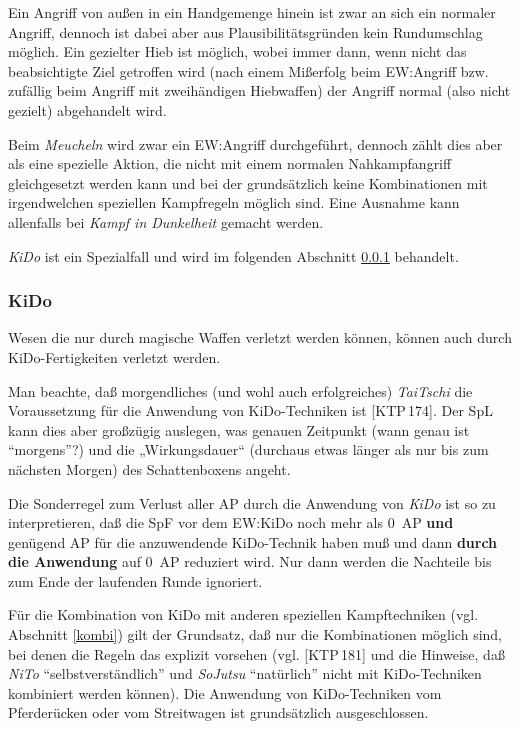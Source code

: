 \documentclass[10pt,a4paper,germanpar]{article}
\begin{document}
Ein Angriff von außen in ein Handgemenge hinein ist zwar an sich ein
normaler Angriff, dennoch ist dabei aber aus Plausibilitätsgründen
kein Rundumschlag möglich. Ein gezielter Hieb ist möglich, wobei immer
dann, wenn nicht das beabsichtigte Ziel getroffen wird (nach einem
Mißerfolg beim EW:Angriff bzw. zufällig beim Angriff mit zweihändigen
Hiebwaffen) der Angriff normal (also nicht gezielt) abgehandelt wird.

Beim \emph{Meucheln} wird zwar ein EW:Angriff durchgeführt, dennoch
zählt dies aber als eine spezielle Aktion, die nicht mit einem
normalen Nahkampfangriff gleichgesetzt werden kann und bei der
grundsätzlich keine Kombinationen mit irgendwelchen speziellen
Kampfregeln möglich sind. Eine Ausnahme kann allenfalls bei
\emph{Kampf in Dunkelheit} gemacht werden.

\emph{KiDo} ist ein Spezialfall und wird im folgenden Abschnitt
\ref{kido} behandelt.

\subsubsection{KiDo}
\label{kido}

Wesen die nur durch magische Waffen verletzt werden können, können
auch durch KiDo-Fertigkeiten verletzt werden.

Man beachte, daß morgendliches (und wohl auch erfolgreiches)
\emph{TaiTschi} die Voraussetzung für die Anwendung von KiDo-Techniken
ist [KTP\,174]. Der SpL kann dies aber großzügig auslegen, was genauen
Zeitpunkt (wann genau ist "`morgens"'?) und die „Wirkungsdauer“
(durchaus etwas länger als nur bis zum nächsten Morgen) des
Schattenboxens angeht.

Die Sonderregel zum Verlust aller AP durch die Anwendung von
\emph{KiDo} ist so zu interpretieren, daß die SpF vor dem EW:KiDo noch
mehr als 0~AP \textbf{und} genügend AP für die anzuwendende
KiDo-Technik haben muß und dann \textbf{durch die Anwendung} auf 0~AP
reduziert wird. Nur dann werden die Nachteile bis zum Ende der
laufenden Runde ignoriert.

Für die Kombination von KiDo mit anderen speziellen Kampftechniken
(vgl. Abschnitt \ref{kombi}) gilt der Grundsatz, daß nur die
Kombinationen möglich sind, bei denen die Regeln das explizit vorsehen
(vgl. [KTP\,181] und die Hinweise, daß \emph{NiTo}
"`selbstverständlich"' und \emph{SoJutsu} "`natürlich"' nicht mit
KiDo-Techniken kombiniert werden können). Die Anwendung von
KiDo-Techniken vom Pferderücken oder vom Streitwagen ist grundsätzlich
ausgeschlossen.
\end{document}
